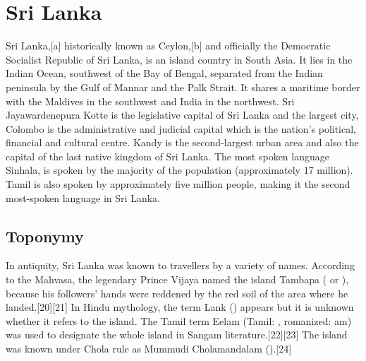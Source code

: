 \documentclass{book}
\begin{document}
\chapter*{Sri Lanka}

Sri Lanka,[a] historically known as Ceylon,[b] and officially the Democratic Socialist Republic of Sri Lanka, is an island country in South Asia. It lies in the Indian Ocean, southwest of the Bay of Bengal, separated from the Indian peninsula by the Gulf of Mannar and the Palk Strait. It shares a maritime border with the Maldives in the southwest and India in the northwest. Sri Jayawardenepura Kotte is the legislative capital of Sri Lanka and the largest city, Colombo is the administrative and judicial capital which is the nation's political, financial and cultural centre. Kandy is the second-largest urban area and also the capital of the last native kingdom of Sri Lanka. The most spoken language Sinhala, is spoken by the majority of the population (approximately 17 million). Tamil is also spoken by approximately five million people, making it the second most-spoken language in Sri Lanka.

\section*{Toponymy}

In antiquity, Sri Lanka was known to travellers by a variety of names. According to the Mahvasa, the legendary Prince Vijaya named the island Tambapa ( or ), because his followers' hands were reddened by the red soil of the area where he landed.[20][21] In Hindu mythology, the term Lank () appears but it is unknown whether it refers to the island. The Tamil term Eelam (Tamil: , romanized: am) was used to designate the whole island in Sangam literature.[22][23] The island was known under Chola rule as Mummudi Cholamandalam ().[24]
\end{document}
